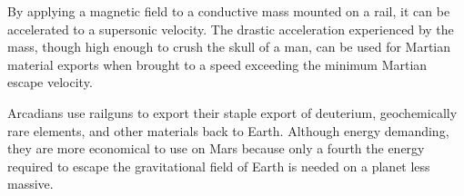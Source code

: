 By applying a magnetic field to a conductive mass mounted on a rail, it can be accelerated to a supersonic velocity. The drastic acceleration experienced by the mass, though high enough to crush the skull of a man, can be used for Martian material exports when brought to a speed exceeding the minimum Martian escape velocity.

Arcadians use railguns to export their staple export of deuterium, geochemically rare elements, and other materials back to Earth. Although energy demanding, they are more economical to use on Mars because only a fourth the energy required to escape the gravitational field of Earth is needed on a planet less massive.

